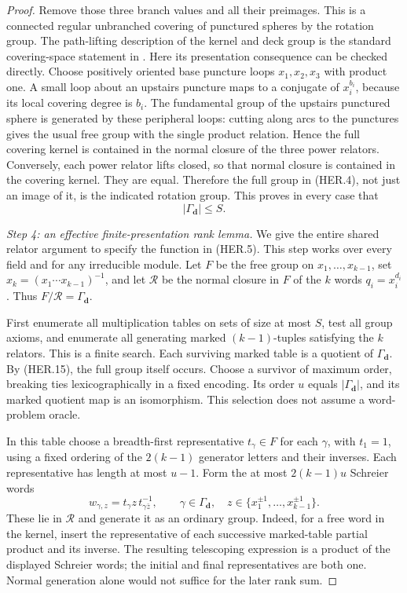 \begin{proof}
Remove those three branch values and all their preimages.  This is
a connected regular unbranched covering of punctured spheres by
the rotation group.  The path-lifting description of the kernel
and deck group is the standard covering-space statement in
\cite[\S1.3, Propositions 1.31--1.32 and 1.39--1.40,
pp.~61 and 71--72]{TD:Hatcher2002}.
Here its presentation consequence can be checked directly.
Choose positively oriented base puncture loops \(x_1,x_2,x_3\)
with product one.  A small loop about an upstairs puncture maps
to a conjugate of \(x_i^{b_i}\), because its local covering degree
is \(b_i\).  The fundamental group of the upstairs punctured
sphere is generated by these peripheral loops: cutting along
arcs to the punctures gives the usual free group with the single
product relation.  Hence the full covering kernel is contained
in the normal closure of the three power relators.  Conversely,
each power relator lifts closed, so that normal closure is
contained in the covering kernel.  They are equal.  Therefore
the full group in (HER.4), not just an image of it, is the indicated
rotation group.  This proves in every case that
\[
                     |\Gamma_{\boldsymbol d}|\le S.
 \tag{HER.15}
\]

\emph{Step 4: an effective finite-presentation rank lemma.}
We give the entire shared relator argument to specify the function
in (HER.5).  This step works over every field and for any irreducible
module.  Let \(F\) be the free group on \(x_1,\ldots,x_{k-1}\), set
\(x_k=(x_1\cdots x_{k-1})^{-1}\), and let \(\mathcal R\) be the
normal closure in \(F\) of the \(k\) words \(q_i=x_i^{d_i}\).
Thus \(F/\mathcal R=\Gamma_{\boldsymbol d}\).

First enumerate all multiplication tables on sets of size at most
\(S\), test all group axioms, and enumerate all generating marked
\((k-1)\)-tuples satisfying the \(k\) relators.  This is a finite
search.  Each surviving marked table is a quotient of
\(\Gamma_{\boldsymbol d}\).  By (HER.15), the full group itself occurs.
Choose a survivor of maximum order, breaking ties lexicographically
in a fixed encoding.  Its order \(u\) equals
\(|\Gamma_{\boldsymbol d}|\), and its marked quotient map is an
isomorphism.  This selection does not assume a word-problem oracle.

In this table choose a breadth-first representative \(t_\gamma\in F\)
for each \(\gamma\), with \(t_1=1\), using a fixed ordering of the
\(2(k-1)\) generator letters and their inverses.  Each representative
has length at most \(u-1\).  Form the at most \(2(k-1)u\) Schreier
words
\[
 w_{\gamma,z}=t_\gamma z\,t_{\gamma\bar z}^{-1},
 \qquad \gamma\in\Gamma_{\boldsymbol d},\quad
 z\in\{x_1^{\pm1},\ldots,x_{k-1}^{\pm1}\}.
 \tag{HER.16}
\]
These lie in \(\mathcal R\) and generate it as an ordinary group.
Indeed, for a free word in the kernel, insert the representative
of each successive marked-table partial product and its inverse.
The resulting telescoping expression is a product of the displayed
Schreier words; the initial and final representatives are both one.
Normal generation alone would not suffice for the later rank sum.


\end{proof}
